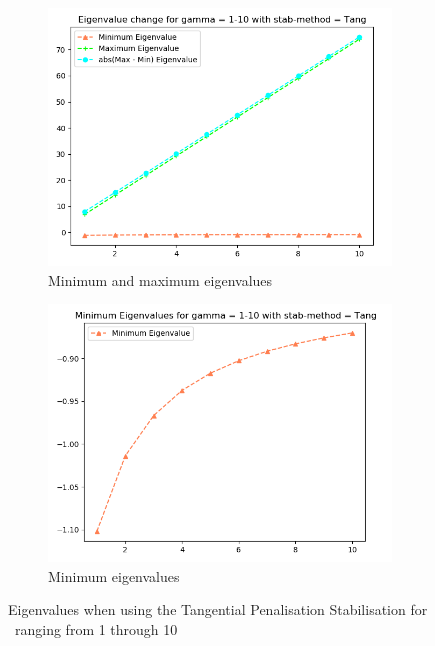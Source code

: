 \begin{figure}[ht]
     \centering
     \begin{subfigure}[h]{0.49\textwidth}
        \centering
\includegraphics[width=\textwidth]{latex/Thesis/media/Gamma_1_thru_10_tang.png}
\caption{Minimum and maximum eigenvalues\label{fig:TangEigLow}}
     \end{subfigure}
     \hfill
     \begin{subfigure}[h]{0.49\textwidth}
\centering
\includegraphics[width=\textwidth]{latex/Thesis/media/Gamma_1_thru_10_tang_min.png}
\caption{Minimum eigenvalues\label{fig:TangEigLowMin}}
     \end{subfigure}
        \caption{Eigenvalues when using the Tangential Penalisation Stabilisation for \mgamma~ranging from 1 through 10}
        \label{fig:TangEigLowmulti}
\end{figure}
